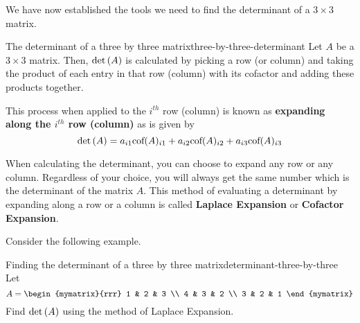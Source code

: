 We have now established the tools we need to find the determinant of a $3 \times3 $ matrix.

\begin{definition}{The determinant of a three by three matrix}{three-by-three-determinant}
Let $A$ be a $3\times 3$ matrix. Then, $\det \left(A\right)$ is calculated by picking a row
(or column) and taking the product of each entry in that row (column) with its
cofactor and adding these products together. 

This process when applied to the $i^{th}$
row (column) is known as \textbf{expanding along the $i^{th}$ row
(column)} as is given by 
\[
\det \left(A\right) = a_{i1}\mbox{\rm cof}(A)_{i1} + a_{i2}\mbox{\rm cof}(A)_{i2} + a_{i3}\mbox{\rm cof}(A)_{i3}
\]

\end{definition}

When calculating the determinant, you can choose to expand any row or any column. Regardless 
of your choice, you will always get the same number which is the determinant of the matrix $A.$ 
This method of evaluating a determinant by expanding along a row or a column is called \textbf{Laplace
Expansion} or \textbf{Cofactor Expansion}.


Consider the following example. 

\begin{example}{Finding the determinant of a three by three matrix}{determinant-three-by-three}
Let 
\begin{equation*}
A=\begin{mymatrix}{rrr}
1 & 2 & 3 \\
4 & 3 & 2 \\
3 & 2 & 1
\end{mymatrix} 
\end{equation*}
Find $\det\left(A\right)$ using the method of Laplace Expansion.
\end{example}

